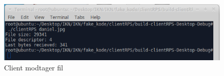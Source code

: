 \begin{figure}[H]
\centering
\includegraphics[width = 300 pt]{Img/client_recieve.PNG}
\caption{Client modtager fil}
\label{fig:konceptbillede}
\end{figure}
